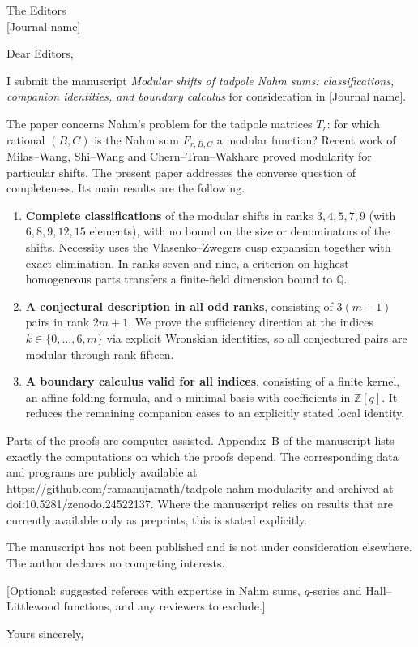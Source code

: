 \documentclass[11pt]{letter}
\begin{document}
\begin{letter}{The Editors\\ {[Journal name]}}
\opening{Dear Editors,}

I submit the manuscript \emph{Modular shifts of tadpole Nahm sums: classifications, companion identities, and boundary calculus} for consideration in [Journal name].

The paper concerns Nahm's problem for the tadpole matrices $T_r$: for which rational $(B,C)$ is the Nahm sum $F_{r,B,C}$ a modular function? Recent work of Milas--Wang, Shi--Wang and Chern--Tran--Wakhare proved modularity for particular shifts. The present paper addresses the converse question of completeness. Its main results are the following.
\begin{enumerate}
\item \textbf{Complete classifications} of the modular shifts in ranks $3,4,5,7,9$ (with $6,8,9,12,15$ elements), with no bound on the size or denominators of the shifts. Necessity uses the Vlasenko--Zwegers cusp expansion together with exact elimination. In ranks seven and nine, a criterion on highest homogeneous parts transfers a finite-field dimension bound to $\mathbb{Q}$.
\item \textbf{A conjectural description in all odd ranks}, consisting of $3(m+1)$ pairs in rank $2m+1$. We prove the sufficiency direction at the indices $k\in\{0,\dots,6,m\}$ via explicit Wronskian identities, so all conjectured pairs are modular through rank fifteen.
\item \textbf{A boundary calculus valid for all indices}, consisting of a finite kernel, an affine folding formula, and a minimal basis with coefficients in $\mathbb{Z}[q]$. It reduces the remaining companion cases to an explicitly stated local identity.
\end{enumerate}

Parts of the proofs are computer-assisted. Appendix~B of the manuscript lists exactly the computations on which the proofs depend. The corresponding data and programs are publicly available at \url{https://github.com/ramanujamath/tadpole-nahm-modularity} and archived at doi:10.5281/zenodo.24522137. Where the manuscript relies on results that are currently available only as preprints, this is stated explicitly.

The manuscript has not been published and is not under consideration elsewhere. The author declares no competing interests.

[Optional: suggested referees with expertise in Nahm sums, $q$-series and Hall--Littlewood functions, and any reviewers to exclude.]

\closing{Yours sincerely,}
\end{letter}
\end{document}
